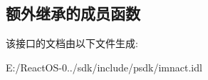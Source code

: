 \subsection*{额外继承的成员函数}


该接口的文档由以下文件生成\+:\begin{DoxyCompactItemize}
\item 
E\+:/\+React\+O\+S-\/0../sdk/include/psdk/imnact.\+idl\end{DoxyCompactItemize}
